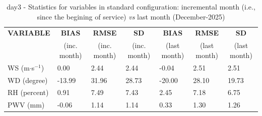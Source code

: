 \begin{table}[h!]
\begin{center}
\begin{tabular}{|l|l|l|l|l|l|l|}
\hline
\multicolumn{1}{|c|}{\cellcolor[HTML]{C0C0C0}\textbf{VARIABLE}} & \multicolumn{1}{c|}{\cellcolor[HTML]{C0C0C0}\textbf{BIAS}} & \multicolumn{1}{c|}{\cellcolor[HTML]{C0C0C0}\textbf{RMSE}} & \multicolumn{1}{c|}{\cellcolor[HTML]{C0C0C0}\textbf{SD}} & \multicolumn{1}{c|}{\cellcolor[HTML]{C0C0C0}\textbf{BIAS}} & \multicolumn{1}{c|}{\cellcolor[HTML]{C0C0C0}\textbf{RMSE}} & \multicolumn{1}{c|}{\cellcolor[HTML]{C0C0C0}\textbf{SD}}\\
\multicolumn{1}{|c|}{\cellcolor[HTML]{C0C0C0}} & \multicolumn{1}{c|}{\cellcolor[HTML]{C0C0C0}(inc. month)} & \multicolumn{1}{c|}{\cellcolor[HTML]{C0C0C0}(inc. month)} & \multicolumn{1}{c|}{\cellcolor[HTML]{C0C0C0}(inc. month)} & \multicolumn{1}{c|}{\cellcolor[HTML]{C0C0C0}(last month)} & \multicolumn{1}{c|}{\cellcolor[HTML]{C0C0C0}(last month)} & \multicolumn{1}{c|}{\cellcolor[HTML]{C0C0C0}(last month)}\\\hline
\cellcolor[HTML]{C0C0C0}WS (m$\cdot$s$^{-1}$) &      0.00  &      2.44  &      2.44  &     -0.04     &      2.51     &      2.51\\
\cellcolor[HTML]{C0C0C0}WD (degree)           &    -13.99  &     31.96  &     28.73  &    -20.00     &     28.10     &     19.73\\
\cellcolor[HTML]{C0C0C0}RH (percent)          &      0.91  &      7.49  &      7.43  &      2.45     &      7.18     &      6.75\\
\cellcolor[HTML]{C0C0C0}PWV (mm)              &     -0.06 &      1.14 &      1.14 &      0.33    &      1.30    &      1.26\\
\hline
\end{tabular}
\caption{day3 - Statistics for variables in standard configuration: incremental month (i.e., since the begining of service) \textit{vs} last month (December-2025)}\label{tab:day3:statBEF}
\end{center}
\end{table}

